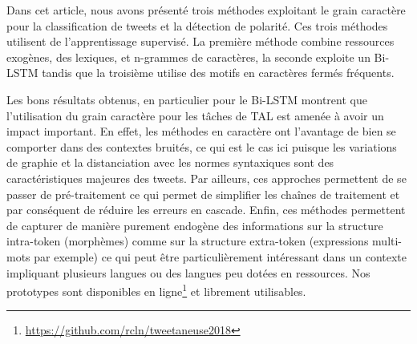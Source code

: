 \label{sec:conclusion}
Dans cet article, nous avons présenté trois méthodes exploitant le grain caractère pour la classification de tweets et la détection de polarité.
Ces trois méthodes utilisent de l'apprentissage supervisé.
La première méthode combine ressources exogènes, des lexiques, et n-grammes de caractères, la seconde exploite un Bi-LSTM tandis que la troisième utilise des motifs en caractères fermés fréquents.

Les bons résultats obtenus, en particulier pour le Bi-LSTM montrent que l'utilisation du grain caractère pour les tâches de TAL est amenée à avoir un impact important.
En effet, les méthodes en caractère ont l'avantage de bien se comporter dans des contextes bruités, ce qui est le cas ici puisque les variations de graphie et la distanciation avec les normes syntaxiques sont des caractéristiques majeures des tweets.
Par ailleurs, ces approches permettent de se passer de pré-traitement ce qui permet de simplifier les chaînes de traitement et par conséquent de réduire les erreurs en cascade\cite{Lejeune-2014}.
Enfin, ces méthodes permettent de capturer de manière purement endogène des informations sur la structure intra-token (morphèmes) comme sur la structure extra-token (expressions multi-mots par exemple) ce qui peut être particulièrement intéressant dans un contexte impliquant plusieurs langues ou des langues peu dotées en ressources.
Nos prototypes sont disponibles en ligne\footnote{\url{https://github.com/rcln/tweetaneuse2018}} et librement utilisables.


